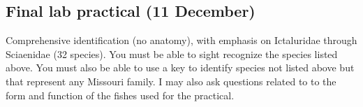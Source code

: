 \documentclass[11pt]{article}
\begin{document}
\subsection*{Final lab practical (11 December)}

Comprehensive identification (no anatomy), with emphasis on Ictaluridae through Sciaenidae (32 species). You must be able to sight recognize the species listed above.  You must also be able to use a key to identify species not listed above but that represent any Missouri family.  I may also ask questions related to to the form and function of the fishes used for the practical.
\end{document}

